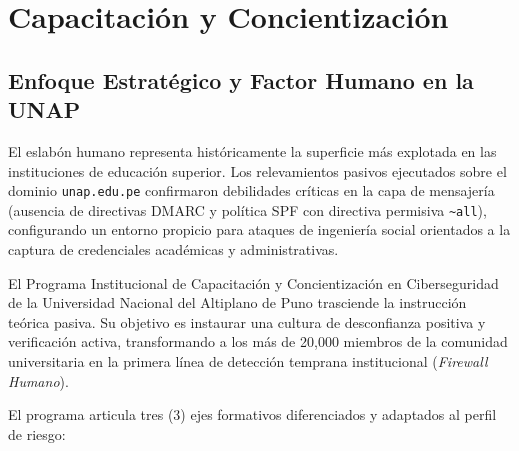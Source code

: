 \chapter{Capacitación y Concientización}
\label{ch:capacitacion_concientizacion}

\section{Enfoque Estratégico y Factor Humano en la UNAP}

El eslabón humano representa históricamente la superficie más explotada en las instituciones de educación superior. Los relevamientos pasivos ejecutados sobre el dominio \texttt{unap.edu.pe} confirmaron debilidades críticas en la capa de mensajería (ausencia de directivas DMARC y política SPF con directiva permisiva \texttt{\textasciitilde all}), configurando un entorno propicio para ataques de ingeniería social orientados a la captura de credenciales académicas y administrativas.

El Programa Institucional de Capacitación y Concientización en Ciberseguridad de la Universidad Nacional del Altiplano de Puno trasciende la instrucción teórica pasiva. Su objetivo es instaurar una cultura de desconfianza positiva y verificación activa, transformando a los más de 20,000 miembros de la comunidad universitaria en la primera línea de detección temprana institucional (\textit{Firewall Humano}).

El programa articula tres (3) ejes formativos diferenciados y adaptados al perfil de riesgo:

